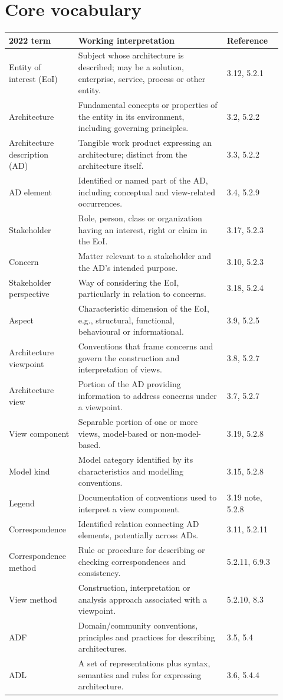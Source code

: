 \documentclass[11pt,letterpaper]{article}
\begin{document}
\section{Core vocabulary}
\small
\begin{longtable}{p{0.225\linewidth}p{0.51\linewidth}p{0.19\linewidth}}
\toprule\textbf{2022 term} & \textbf{Working interpretation} & \textbf{Reference}\\\midrule\endhead
Entity of interest (EoI)& Subject whose architecture is described; may be a solution, enterprise, service, process or other entity. & 3.12, 5.2.1\\
Architecture& Fundamental concepts or properties of the entity in its environment, including governing principles. & 3.2, 5.2.2\\
Architecture description (AD)& Tangible work product expressing an architecture; distinct from the architecture itself. & 3.3, 5.2.2\\
AD element& Identified or named part of the AD, including conceptual and view-related occurrences. & 3.4, 5.2.9\\
Stakeholder& Role, person, class or organization having an interest, right or claim in the EoI. & 3.17, 5.2.3\\
Concern& Matter relevant to a stakeholder and the AD's intended purpose. & 3.10, 5.2.3\\
Stakeholder perspective& Way of considering the EoI, particularly in relation to concerns. & 3.18, 5.2.4\\
Aspect& Characteristic dimension of the EoI, e.g., structural, functional, behavioural or informational. & 3.9, 5.2.5\\
Architecture viewpoint& Conventions that frame concerns and govern the construction and interpretation of views. & 3.8, 5.2.7\\
Architecture view& Portion of the AD providing information to address concerns under a viewpoint. & 3.7, 5.2.7\\
View component& Separable portion of one or more views, model-based or non-model-based. & 3.19, 5.2.8\\
Model kind& Model category identified by its characteristics and modelling conventions. & 3.15, 5.2.8\\
Legend& Documentation of conventions used to interpret a view component. & 3.19 note, 5.2.8\\
Correspondence& Identified relation connecting AD elements, potentially across ADs. & 3.11, 5.2.11\\
Correspondence method& Rule or procedure for describing or checking correspondences and consistency. & 5.2.11, 6.9.3\\
View method& Construction, interpretation or analysis approach associated with a viewpoint. & 5.2.10, 8.3\\
ADF& Domain/community conventions, principles and practices for describing architectures. & 3.5, 5.4\\
ADL& A set of representations plus syntax, semantics and rules for expressing architecture. & 3.6, 5.4.4\\
\bottomrule
\end{longtable}
\normalsize
\end{document}
